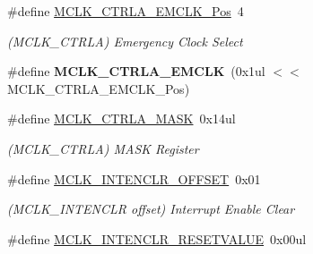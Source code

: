 \begin{DoxyCompactItemize}
\item 
\hypertarget{group___s_a_m_l21___m_c_l_k_ga0cb8f036eb99a36847c7a9bd19d92dcd}{}\#define \hyperlink{group___s_a_m_l21___m_c_l_k_ga0cb8f036eb99a36847c7a9bd19d92dcd}{M\+C\+L\+K\+\_\+\+C\+T\+R\+L\+A\+\_\+\+E\+M\+C\+L\+K\+\_\+\+Pos}~4\label{group___s_a_m_l21___m_c_l_k_ga0cb8f036eb99a36847c7a9bd19d92dcd}

\begin{DoxyCompactList}\small\item\em (M\+C\+L\+K\+\_\+\+C\+T\+R\+L\+A) Emergency Clock Select \end{DoxyCompactList}\item 
\hypertarget{group___s_a_m_l21___m_c_l_k_ga7e6bf9f673c9ea7dd905f38b2aa3c8a3}{}\#define {\bfseries M\+C\+L\+K\+\_\+\+C\+T\+R\+L\+A\+\_\+\+E\+M\+C\+L\+K}~(0x1ul $<$$<$ M\+C\+L\+K\+\_\+\+C\+T\+R\+L\+A\+\_\+\+E\+M\+C\+L\+K\+\_\+\+Pos)\label{group___s_a_m_l21___m_c_l_k_ga7e6bf9f673c9ea7dd905f38b2aa3c8a3}

\item 
\hypertarget{group___s_a_m_l21___m_c_l_k_gaf37c133548e9d6a6ec49db11b80587dc}{}\#define \hyperlink{group___s_a_m_l21___m_c_l_k_gaf37c133548e9d6a6ec49db11b80587dc}{M\+C\+L\+K\+\_\+\+C\+T\+R\+L\+A\+\_\+\+M\+A\+S\+K}~0x14ul\label{group___s_a_m_l21___m_c_l_k_gaf37c133548e9d6a6ec49db11b80587dc}

\begin{DoxyCompactList}\small\item\em (M\+C\+L\+K\+\_\+\+C\+T\+R\+L\+A) M\+A\+S\+K Register \end{DoxyCompactList}\item 
\hypertarget{group___s_a_m_l21___m_c_l_k_ga68637b3f1fed0ccd3ae371c53992e406}{}\#define \hyperlink{group___s_a_m_l21___m_c_l_k_ga68637b3f1fed0ccd3ae371c53992e406}{M\+C\+L\+K\+\_\+\+I\+N\+T\+E\+N\+C\+L\+R\+\_\+\+O\+F\+F\+S\+E\+T}~0x01\label{group___s_a_m_l21___m_c_l_k_ga68637b3f1fed0ccd3ae371c53992e406}

\begin{DoxyCompactList}\small\item\em (M\+C\+L\+K\+\_\+\+I\+N\+T\+E\+N\+C\+L\+R offset) Interrupt Enable Clear \end{DoxyCompactList}\item 
\hypertarget{group___s_a_m_l21___m_c_l_k_gad173bb9dba9e1522a644dbde879829d4}{}\#define \hyperlink{group___s_a_m_l21___m_c_l_k_gad173bb9dba9e1522a644dbde879829d4}{M\+C\+L\+K\+\_\+\+I\+N\+T\+E\+N\+C\+L\+R\+\_\+\+R\+E\+S\+E\+T\+V\+A\+L\+U\+E}~0x00ul\label{group___s_a_m_l21___m_c_l_k_gad173bb9dba9e1522a644dbde879829d4}


\end{DoxyCompactItemize}
